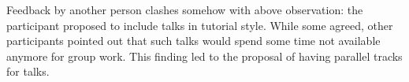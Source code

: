 Feedback by another person clashes somehow with above observation: the participant proposed to include talks in tutorial style. While some agreed, other participants pointed out that such talks would spend some time not available anymore for group work. This finding led to the proposal of having parallel tracks for talks.
